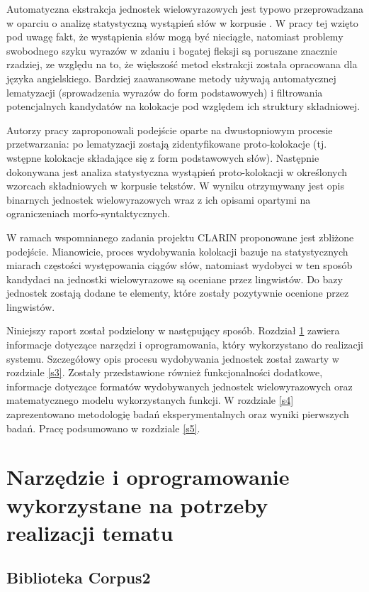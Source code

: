 \documentclass[11pt,a4paper]{llncs}
\begin{document}
Automatyczna ekstrakcja jednostek wielowyrazowych jest typowo przeprowadzana w oparciu o analizę statystyczną wystąpień słów w korpusie \cite{baldwin}. W pracy tej wzięto pod uwagę fakt, że wystąpienia słów mogą być nieciągłe, natomiast problemy swobodnego szyku wyrazów w zdaniu i bogatej fleksji są poruszane znacznie rzadziej, ze względu na to, że większość metod ekstrakcji została opracowana dla języka angielskiego. Bardziej zaawansowane metody używają automatycznej lematyzacji (sprowadzenia wyrazów do form podstawowych) i filtrowania potencjalnych kandydatów na kolokacje pod względem ich struktury składniowej.  

Autorzy pracy \cite{broda} zaproponowali podejście oparte na dwustopniowym procesie przetwarzania: po lematyzacji zostają zidentyfikowane proto-kolokacje (tj. wstępne kolokacje składające się z form podstawowych słów). Następnie dokonywana jest analiza statystyczna wystąpień proto-kolokacji w określonych wzorcach składniowych w korpusie tekstów. W wyniku otrzymywany jest opis binarnych jednostek wielowyrazowych wraz z ich opisami opartymi na ograniczeniach morfo-syntaktycznych.

W ramach wspomnianego zadania projektu CLARIN proponowane jest zbliżone podejście. Mianowicie, proces wydobywania kolokacji bazuje na statystycznych miarach częstości występowania ciągów słów, natomiast wydobyci w ten sposób kandydaci na jednostki wielowyrazowe są oceniane przez lingwistów. Do bazy jednostek zostają dodane te elementy, które zostały pozytywnie ocenione przez lingwistów. 

Niniejszy raport został podzielony w następujący sposób. Rozdział \ref{s2} zawiera informacje dotyczące narzędzi i oprogramowania, który wykorzystano do realizacji systemu. Szczegółowy opis procesu wydobywania jednostek został zawarty w rozdziale \ref{s3}. Zostały przedstawione również funkcjonalności dodatkowe, informacje dotyczące formatów wydobywanych jednostek wielowyrazowych oraz matematycznego modelu wykorzystanych funkcji. W rozdziale \ref{s4} zaprezentowano metodologię badań eksperymentalnych oraz wyniki pierwszych badań. Pracę podsumowano w rozdziale \ref{s5}.


\section{Narzędzie i oprogramowanie wykorzystane na potrzeby realizacji tematu}\label{s2}


\subsection{Biblioteka Corpus2}
\end{document}
